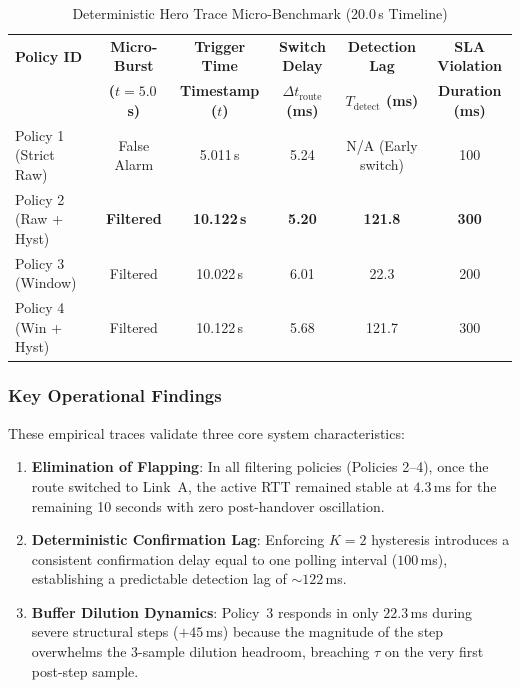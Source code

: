 \begin{table}[htbp]
\caption{Deterministic Hero Trace Micro-Benchmark (20.0\,s Timeline)}
\label{tab:hero_trace_metrics_standalone}
\centering
\begin{tabular}{lccccc}
\toprule
\textbf{Policy ID} & \textbf{Micro-Burst} & \textbf{Trigger Time} & \textbf{Switch Delay} & \textbf{Detection Lag} & \textbf{SLA Violation} \\
& \textbf{($t=5.0$\,s)} & \textbf{Timestamp ($t$)} & \textbf{$\Delta t_{\text{route}}$ (ms)} & \textbf{$T_{\text{detect}}$ (ms)} & \textbf{Duration (ms)} \\
\midrule
Policy 1 (Strict Raw)    & False Alarm          & 5.011\,s          & 5.24       & N/A (Early switch) & 100 \\
Policy 2 (Raw + Hyst)    & \textbf{Filtered}    & \textbf{10.122\,s} & \textbf{5.20} & \textbf{121.8}     & \textbf{300} \\
Policy 3 (Window)        & Filtered             & 10.022\,s          & 6.01       & 22.3               & 200 \\
Policy 4 (Win + Hyst)    & Filtered             & 10.122\,s          & 5.68       & 121.7              & 300 \\
\bottomrule
\end{tabular}
\end{table}

\subsubsection{Key Operational Findings}
These empirical traces validate three core system characteristics:
\begin{enumerate}
    \item \textbf{Elimination of Flapping}: In all filtering policies (Policies 2--4), once the route switched to Link~A, the active RTT remained stable at $4.3$\,ms for the remaining 10 seconds with zero post-handover oscillation.
    \item \textbf{Deterministic Confirmation Lag}: Enforcing $K=2$ hysteresis introduces a consistent confirmation delay equal to one polling interval ($100$\,ms), establishing a predictable detection lag of $\sim 122$\,ms.
    \item \textbf{Buffer Dilution Dynamics}: Policy~3 responds in only $22.3$\,ms during severe structural steps ($+45$\,ms) because the magnitude of the step overwhelms the 3-sample dilution headroom, breaching $\tau$ on the very first post-step sample.
\end{enumerate}

